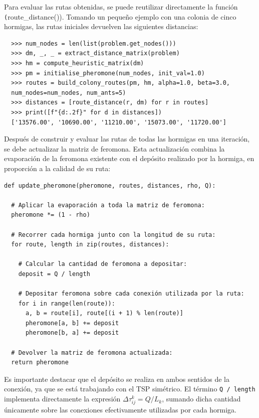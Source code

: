 Para evaluar las rutas obtenidas, se puede reutilizar directamente la función \texttt(route\_distance()). Tomando un 
pequeño ejemplo con una colonia de cinco hormigas, las rutas iniciales devuelven las siguientes distancias:
\begin{verbatim}
  >>> num_nodes = len(list(problem.get_nodes()))
  >>> dm, _, _ = extract_distance_matrix(problem)
  >>> hm = compute_heuristic_matrix(dm)
  >>> pm = initialise_pheromone(num_nodes, init_val=1.0)
  >>> routes = build_colony_routes(pm, hm, alpha=1.0, beta=3.0, 
  num_nodes=num_nodes, num_ants=5)
  >>> distances = [route_distance(r, dm) for r in routes]
  >>> print([f"{d:.2f}" for d in distances])
  ['13576.00', '10690.00', '11210.00', '15073.00', '11720.00']
\end{verbatim}

Después de construir y evaluar las rutas de todas las hormigas en una iteración, se debe actualizar la matriz de 
feromona. Esta actualización combina la evaporación de la feromona existente con el depósito realizado por la hormiga,
en proporción a la calidad de su ruta:
\newline
\begin{lstlisting}[style=PythonStyle]
def update_pheromone(pheromone, routes, distances, rho, Q):
 
  # Aplicar la evaporación a toda la matriz de feromona:
  pheromone *= (1 - rho)
 
  # Recorrer cada hormiga junto con la longitud de su ruta:
  for route, length in zip(routes, distances):
 
    # Calcular la cantidad de feromona a depositar:
    deposit = Q / length
 
    # Depositar feromona sobre cada conexión utilizada por la ruta:
    for i in range(len(route)):
      a, b = route[i], route[(i + 1) % len(route)]
      pheromone[a, b] += deposit
      pheromone[b, a] += deposit
 
  # Devolver la matriz de feromona actualizada:
  return pheromone
\end{lstlisting}

Es importante destacar que el depósito se realiza en ambos sentidos de la conexión, ya que se está trabajando con el TSP
simétrico. El término \texttt{Q / length} implementa directamente la expresión $\Delta\tau_{ij}^{k} = Q/L_k$, sumando dicha
cantidad únicamente sobre las conexiones efectivamente utilizadas por cada hormiga.

